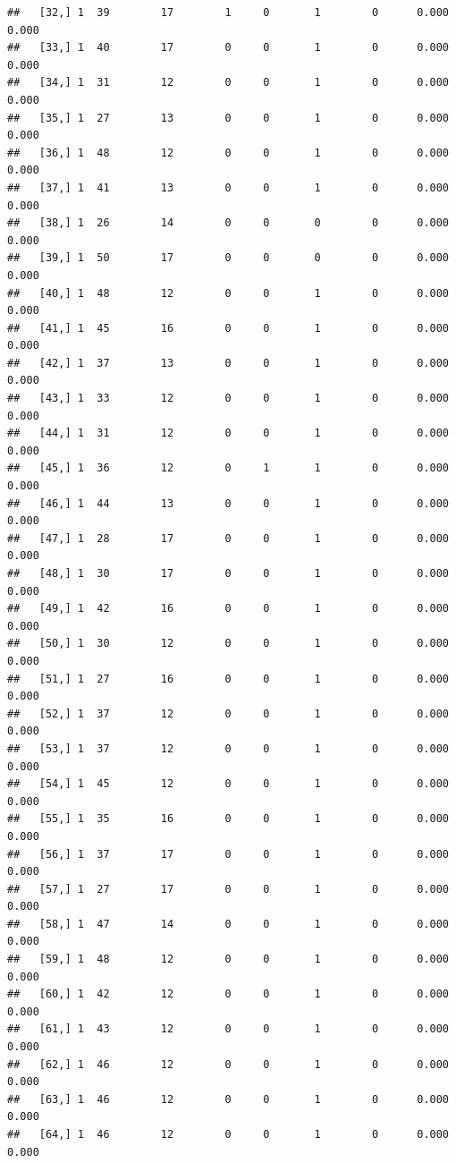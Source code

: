 \documentclass[
]{article}
\begin{document}
\begin{verbatim}
##   [32,] 1  39        17        1     0       1        0      0.000      0.000
##   [33,] 1  40        17        0     0       1        0      0.000      0.000
##   [34,] 1  31        12        0     0       1        0      0.000      0.000
##   [35,] 1  27        13        0     0       1        0      0.000      0.000
##   [36,] 1  48        12        0     0       1        0      0.000      0.000
##   [37,] 1  41        13        0     0       1        0      0.000      0.000
##   [38,] 1  26        14        0     0       0        0      0.000      0.000
##   [39,] 1  50        17        0     0       0        0      0.000      0.000
##   [40,] 1  48        12        0     0       1        0      0.000      0.000
##   [41,] 1  45        16        0     0       1        0      0.000      0.000
##   [42,] 1  37        13        0     0       1        0      0.000      0.000
##   [43,] 1  33        12        0     0       1        0      0.000      0.000
##   [44,] 1  31        12        0     0       1        0      0.000      0.000
##   [45,] 1  36        12        0     1       1        0      0.000      0.000
##   [46,] 1  44        13        0     0       1        0      0.000      0.000
##   [47,] 1  28        17        0     0       1        0      0.000      0.000
##   [48,] 1  30        17        0     0       1        0      0.000      0.000
##   [49,] 1  42        16        0     0       1        0      0.000      0.000
##   [50,] 1  30        12        0     0       1        0      0.000      0.000
##   [51,] 1  27        16        0     0       1        0      0.000      0.000
##   [52,] 1  37        12        0     0       1        0      0.000      0.000
##   [53,] 1  37        12        0     0       1        0      0.000      0.000
##   [54,] 1  45        12        0     0       1        0      0.000      0.000
##   [55,] 1  35        16        0     0       1        0      0.000      0.000
##   [56,] 1  37        17        0     0       1        0      0.000      0.000
##   [57,] 1  27        17        0     0       1        0      0.000      0.000
##   [58,] 1  47        14        0     0       1        0      0.000      0.000
##   [59,] 1  48        12        0     0       1        0      0.000      0.000
##   [60,] 1  42        12        0     0       1        0      0.000      0.000
##   [61,] 1  43        12        0     0       1        0      0.000      0.000
##   [62,] 1  46        12        0     0       1        0      0.000      0.000
##   [63,] 1  46        12        0     0       1        0      0.000      0.000
##   [64,] 1  46        12        0     0       1        0      0.000      0.000

\end{verbatim}
\end{document}
